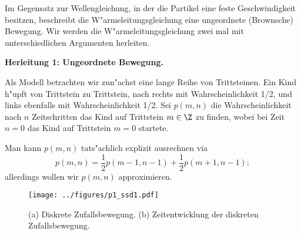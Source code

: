 Im Gegensatz zur Wellengleichung, in der die Partikel eine feste Geschwindigkeit 
besitzen, beschreibt die W"armeleitungsgleichung eine ungeordnete (Brownsche) 
Bewegung. Wir werden die W"armeleitungsgleichung 
zwei mal mit unterschiedlichen Argumenten herleiten.\par\medskip

{\bf Herleitung 1: Ungeordnete Bewegung.}\par
Als Modell betrachten wir zun"achst eine lange Reihe von Trittsteinen. 
Ein Kind h"upft von Trittstein zu Trittstein, nach rechts mit Wahrscheinlichkeit 
1/2, und links ebenfalls mit Wahrscheinlichkeit 1/2. 
Sei $p(m,n)$ die Wahrscheinlichkeit nach $n$ Zeitschritten das Kind auf 
Trittstein $m\in\Z$ zu finden, wobei bei Zeit $n=0$ das Kind auf Trittstein $m=0$ 
startete. \par
Man kann $p(m,n)$ tats"achlich explizit ausrechnen via 
$$ p(m,n) = \frac 1 2 p(m-1,n-1) + \frac 1 2 p(m+1,n-1);
$$
allerdings wollen wir $p(m,n)$ approximieren. 


\begin{figure}[htbp] %
   \centering
   \texttt{[image: ../figures/p1\_ssd1.pdf]} 
   \caption{(a) Diskrete Zufallsbewegung. (b) Zeitentwicklung der diskreten Zufallsbewegung.}
\label{pde2}
\end{figure}



